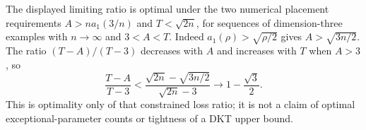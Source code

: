 \begin{remark}
The displayed limiting ratio is optimal under the two numerical
placement requirements $A>n a_1(3/n)$ and $T<\sqrt{2n}$, for sequences
of dimension-three examples with $n\to\infty$ and $3<A<T$.
Indeed $a_1(\rho)>\sqrt{\rho/2}$ gives $A>\sqrt{3n/2}$.
The ratio $(T-A)/(T-3)$ decreases with $A$ and increases with $T$ when
$A>3$, so
\[
 \frac{T-A}{T-3}
 <
 \frac{\sqrt{2n}-\sqrt{3n/2}}{\sqrt{2n}-3}
 \longrightarrow1-\frac{\sqrt3}{2}.
\]
This is optimality only of that constrained loss ratio; it is not a
claim of optimal exceptional-parameter counts or tightness of a DKT
upper bound.
\end{remark}
